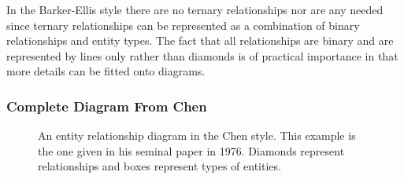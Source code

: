 In the Barker-Ellis style there are no ternary relationships nor are any needed since ternary relationships can be represented as a combination of binary relationships and entity types. The fact that all relationships are binary and are represented by lines only rather than diamonds  is of practical importance in that more details can be fitted onto diagrams.

\subsubsection*{Complete Diagram From Chen}
\begin{figure}
\begin{center}

\end{center}
\caption{
An entity relationship diagram in the Chen style. This example is the one given in his seminal paper in 1976.
Diamonds represent relationships and boxes represent types of entities.
}
\end{figure}